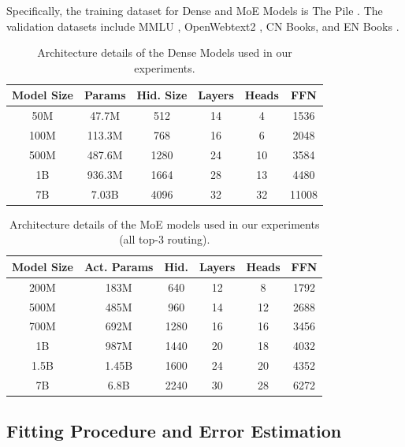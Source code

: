 \documentclass[letterpaper]{article} %
\begin{document}
Specifically, the training dataset for Dense and MoE Models is The Pile \cite{gao2020pile}. The validation datasets include MMLU \cite{Hendrycks2020MeasuringMM}, OpenWebtext2 \cite{Gokaslan2019OpenWeb}, CN Books, and EN Books \cite{Zhu2015AligningBA}.

\begin{table}[h]
	\centering
	\setlength{\tabcolsep}{3pt}
	\renewcommand{\arraystretch}{1.2}
	\begin{tabular}{cccccc}
		\toprule
		\textbf{Model Size} & \textbf{Params} & \textbf{Hid. Size} & \textbf{Layers} & \textbf{Heads} & \textbf{FFN} \\
		\midrule
		50M  & 47.7M   & 512  & 14 & 4  & 1536  \\
		100M & 113.3M  & 768  & 16 & 6  & 2048  \\
		500M & 487.6M  & 1280 & 24 & 10 & 3584  \\
		1B   & 936.3M  & 1664 & 28 & 13 & 4480  \\
		7B   & 7.03B   & 4096 & 32 & 32 & 11008 \\
		\bottomrule
	\end{tabular}
	\caption{Architecture details of the Dense Models used in our experiments.}
	\label{tab:dense_arch}
\end{table}
\begin{table}[h]
	\centering
	\setlength{\tabcolsep}{3pt}  
	\renewcommand{\arraystretch}{1.2}
	\begin{tabular}{cccccc}
		\toprule
		\textbf{Model Size} & \textbf{Act. Params} & \textbf{Hid.} & \textbf{Layers} & \textbf{Heads} & \textbf{FFN} \\
		\midrule
		200M  & 183M  & 640  & 12 & 8  & 1792 \\
		500M  & 485M  & 960  & 14 & 12 & 2688 \\
		700M  & 692M  & 1280 & 16 & 16 & 3456 \\
		1B    & 987M  & 1440 & 20 & 18 & 4032 \\
		1.5B  & 1.45B & 1600 & 24 & 20 & 4352 \\
		7B    & 6.8B  & 2240 & 30 & 28 & 6272 \\
		\bottomrule
	\end{tabular}
	\caption{Architecture details of the MoE models used in our experiments (all top-3 routing).}
	\label{tab:moe_arch}
\end{table}


\subsection{Fitting Procedure and Error Estimation}
\label{subsec:fitting_details}
\end{document}
